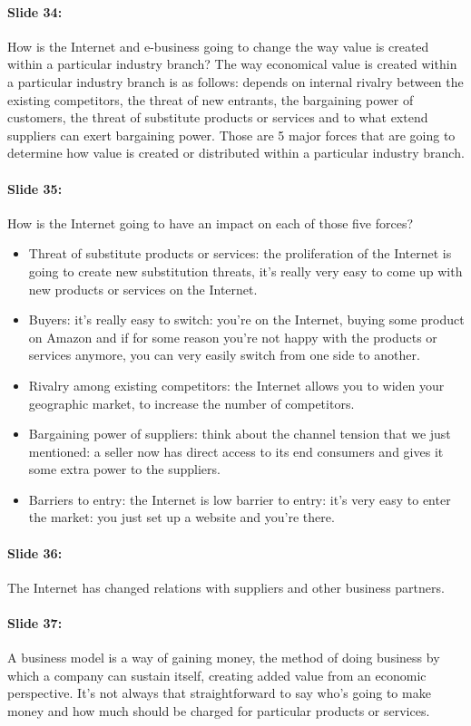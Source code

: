 \documentclass[10pt,a4paper]{report}
\begin{document}
\paragraph{Slide 34:}How is the Internet and e-business going to change the way value is created within a particular industry branch? The way economical value is created within a particular industry branch is as follows: depends on internal rivalry between the existing competitors, the threat of new entrants, the bargaining power of customers, the threat of substitute products or services and to what extend suppliers can exert bargaining power. Those are 5 major forces that are going to determine how value is created or distributed within a particular industry branch.

\paragraph{Slide 35:}How is the Internet going to have an impact on each of those five forces?
\begin{itemize}
\item Threat of substitute products or services: the proliferation of the Internet is going to create new substitution threats, it's really very easy to come up with new products or services on the Internet.
\item Buyers: it's really easy to switch: you're on the Internet, buying some product on Amazon and if for some reason you're not happy with the products or services anymore, you can very easily switch from one side to another.
\item Rivalry among existing competitors: the Internet allows you to widen your geographic market, to increase the number of competitors.
\item Bargaining power of suppliers: think about the channel tension that we just mentioned: a seller now has direct access to its end consumers and gives it some extra power to the suppliers.
\item Barriers to entry: the Internet is low barrier to entry: it's very easy to enter the market: you just set up a website and you're there.
\end{itemize}

\paragraph{Slide 36:}The Internet has changed relations with suppliers and other business partners.

\paragraph{Slide 37:}A business model is a way of gaining money, the method of doing business by which a company can sustain itself, creating added value from an economic perspective. It's not always that straightforward to say who's going to make money and how much should be charged for particular products or services.
\end{document}
